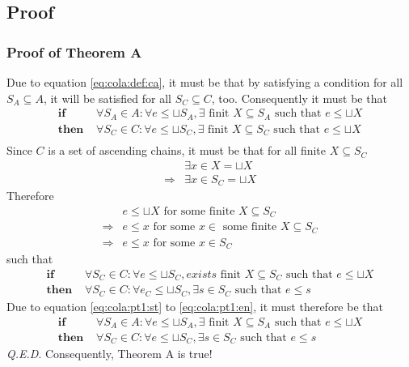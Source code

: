 \subsection{Proof}
\subsubsection{Proof of Theorem A}
Due to equation \ref{eq:cola:def:ca}, it must be that by satisfying a condition for all $S_A \subseteq A$, it will be satisfied for all $S_C \subseteq C$, too. Consequently it must be that
\begin{align}
	\textbf{if }		& \forall S_A \in A: \forall e \leq \sqcup S_A, 																		\label{eq:cola:pt1:st}
										\exists \text{ finit } X \subseteq S_A \text{ such that } e \leq \sqcup X \\
	\textbf{then }	& \forall S_C \in C: \forall e \leq \sqcup S_C,
										\exists \text{ finit } X \subseteq S_C \text{ such that } e \leq \sqcup X \\			\label{eq:cola:pt1:en}
\end{align}
Since $C$ is a set of ascending chains, it must be that for all finite $X \subseteq S_C$
\begin{align}
						& \exists x \in X = \sqcup X \\
\Rightarrow & \exists x \in S_C = \sqcup X
\end{align}
Therefore
\begin{align}
						&	e \leq \sqcup X \text{ for some finite } X \subseteq S_C \\
\Rightarrow	& e \leq x \text{ for some } x \in \text{ some finite } X \subseteq S_C \\
\Rightarrow & e \leq x \text{ for some } x \in S_C
\end{align}
such that 
\begin{align}
	\textbf{if }		& \forall S_C \in C: \forall e \leq \sqcup S_C,
										exists \text{ finit } X \subseteq S_C \text{ such that } e \leq \sqcup X \\
	\textbf{then }	& \forall S_C \in C: \forall e_C \leq \sqcup S_C,
										\exists s \in S_C \text{ such that } e \leq s 
\end{align}
Due to equation \ref{eq:cola:pt1:st} to \ref{eq:cola:pt1:en}, it must therefore be that
\begin{align}
	\textbf{if }		& \forall S_A \in A: \forall e \leq \sqcup S_A,
										\exists \text{ finit } X \subseteq S_A \text{ such that } e \leq \sqcup X \\
	\textbf{then }	& \forall S_C \in C: \forall e \leq \sqcup S_C,
										\exists s \in S_C \text{ such that } e \leq s
\end{align}
\emph{Q.E.D}. Consequently, Theorem A is true!


